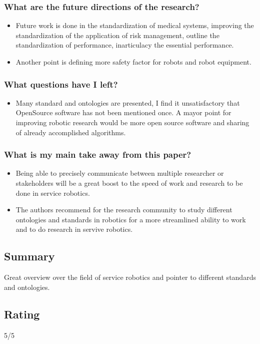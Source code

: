     \subsubsection*{What are the future directions of the research?}
    \begin{itemize}
        \item Future work is done in the standardization of medical systems, improving the standardization of the application of risk management, outline the standardization of performance, inarticulacy the essential performance.
        \item Another point is defining more safety factor for robots and robot equipment.
    \end{itemize}
    \subsubsection*{What questions have I left?}
    \begin{itemize}
        \item Many standard and ontologies are presented, I find it unsatisfactory that OpenSource software has not been mentioned once. A mayor point for improving robotic research would be more open source software and sharing of already accomplished algorithms.
    \end{itemize}
    \subsubsection*{What is my main take away from this paper?}
    \begin{itemize}
        \item Being able to precisely communicate between multiple researcher or stakeholders will be a great boost to the speed of work and research to be done in service robotics.
        \item The authors recommend for the research community to study different ontologies and standards in robotics for a more streamlined ability to work and to do research in servive robotics.
    \end{itemize}
    
    \subsection*{Summary}
    Great overview over the field of service robotics and pointer to different standards and ontologies.
    
    \subsection*{Rating}
    5/5

